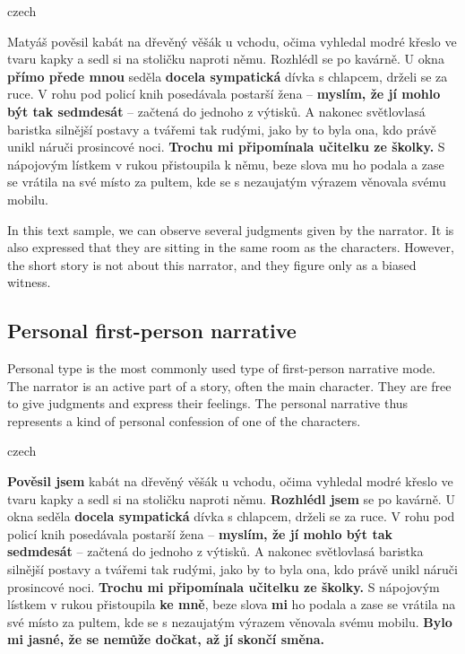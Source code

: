 \begin{otherlanguage*}{czech}
\begin{quoting}
Matyáš pověsil kabát na dřevěný věšák u vchodu, očima vyhledal modré křeslo ve tvaru kapky a sedl si na stoličku naproti němu. Rozhlédl se po kavárně. U okna \textbf{přímo přede mnou} seděla \textbf{docela sympatická} dívka s chlapcem, drželi se za ruce. V rohu pod policí knih posedávala postarší žena -- \textbf{myslím, že jí mohlo být tak sedmdesát} -- začtená do jednoho z výtisků. A nakonec světlovlasá baristka silnější postavy a tvářemi tak rudými, jako by to byla ona, kdo právě unikl náruči prosincové noci. \textbf{Trochu mi připomínala učitelku ze školky.} S nápojovým lístkem v rukou přistoupila k němu, beze slova mu ho podala a zase se vrátila na své místo za pultem, kde se s nezaujatým výrazem věnovala svému mobilu.
\newline
\end{quoting}
\end{otherlanguage*}

In this text sample, we can observe several judgments given by the narrator. It is also expressed that they are sitting in the same room as the characters. However, the short story is not about this narrator, and they figure only as a biased witness.

\subsection{Personal first-person narrative}
Personal type is the most commonly used type of first-person narrative mode. The narrator is an active part of a story, often the main character. They are free to give judgments and express their feelings. The personal narrative thus represents a kind of personal confession of one of the characters. \cite{dolezel-narativni-zpusoby}\newline

\begin{otherlanguage*}{czech}
\begin{quoting}
\textbf{Pověsil jsem} kabát na dřevěný věšák u vchodu, očima vyhledal modré křeslo ve tvaru kapky a sedl si na stoličku naproti němu. \textbf{Rozhlédl jsem} se po kavárně. U okna seděla \textbf{docela sympatická} dívka s chlapcem, drželi se za ruce. V rohu pod policí knih posedávala postarší žena -- \textbf{myslím, že jí mohlo být tak sedmdesát} -- začtená do jednoho z výtisků. A nakonec světlovlasá baristka silnější postavy a tvářemi tak rudými, jako by to byla ona, kdo právě unikl náruči prosincové noci. \textbf{Trochu mi připomínala učitelku ze školky.} S nápojovým lístkem v rukou přistoupila \textbf{ke mně}, beze slova \textbf{mi} ho podala a zase se vrátila na své místo za pultem, kde se s nezaujatým výrazem věnovala svému mobilu. \textbf{Bylo mi jasné, že se nemůže dočkat, až jí skončí směna.} \newline
\end{quoting}
\end{otherlanguage*}

